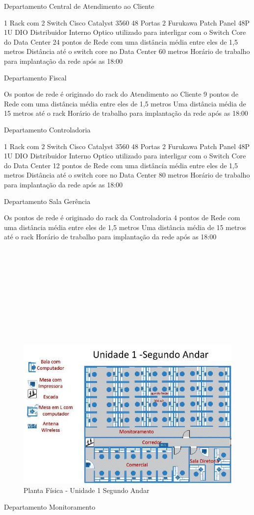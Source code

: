 \documentclass[	DIV=calc,%
							paper=a4,%
							fontsize=12pt,%
							onecolumn]{scrartcl}	 					%
\begin{document}
Departamento Central de Atendimento ao Cliente

1 Rack com 2 Switch Cisco Catalyst 3560 48 Portas
2 Furukawa Patch Panel 48P 1U
DIO Distribuidor Interno Optico utilizado para interligar com o Switch Core do Data Center
24 pontos de Rede com uma distância média entre eles de 1,5 metros
Distância até o switch core no Data Center 60 metros
Horário de trabalho para implantação da rede após as 18:00

	Departamento Fiscal

Os pontos de rede é originado do rack do Atendimento ao Cliente
9 pontos de Rede com uma distância média entre eles de 1,5 metros
Uma distância média de 15 metros até o rack
Horário de trabalho para implantação da rede após as 18:00

Departamento Controladoria

1 Rack com 2 Switch Cisco Catalyst 3560 48 Portas
2 Furukawa Patch Panel 48P 1U
DIO Distribuidor Interno Optico utilizado para interligar com o Switch Core do Data Center
12 pontos de Rede com uma distância média entre eles de 1,5 metros
Distância até o switch core no Data Center 80 metros
Horário de trabalho para implantação da rede após as 18:00

	Departamento Sala Gerência

Os pontos de rede é originado do rack da Controladoria
4 pontos de Rede com uma distância média entre eles de 1,5 metros
Uma distância média de 15 metros até o rack
Horário de trabalho para implantação da rede após as 18:00
\\
\\
\\
\\
\\
\\
\\
\\
\\
\\
\\
\begin{figure}
	\centering
	\includegraphics[]{fig4}
	\caption{Planta Física - Unidade 1 Segundo Andar}
	\label{fig4}
\end{figure}
Departamento Monitoramento
\end{document}
